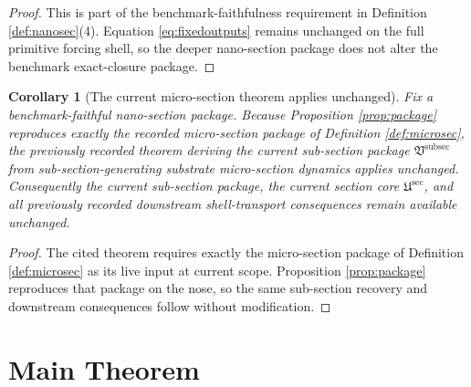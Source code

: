 \documentclass[11pt]{article}
\newcommand{\SubPreSectionCore}{\mathfrak U^{\mathrm{sec}}}
\newcommand{\SubSectionPackage}{\mathfrak V^{\mathrm{subsec}}}
\newtheorem{corollary}{Corollary}
\begin{document}
\begin{proof}
This is part of the benchmark-faithfulness requirement in Definition \ref{def:nanosec}(4). Equation \eqref{eq:fixedoutputs} remains unchanged on the full primitive forcing shell, so the deeper nano-section package does not alter the benchmark exact-closure package.
\end{proof}

\begin{corollary}[The current micro-section theorem applies unchanged]
\label{cor:micro}
Fix a benchmark-faithful nano-section package. Because Proposition \ref{prop:package} reproduces exactly the recorded micro-section package of Definition \ref{def:microsec}, the previously recorded theorem deriving the current sub-section package \(\SubSectionPackage\) from sub-section-generating substrate micro-section dynamics applies unchanged. Consequently the current sub-section package, the current section core \(\SubPreSectionCore\), and all previously recorded downstream shell-transport consequences remain available unchanged.
\end{corollary}

\begin{proof}
The cited theorem requires exactly the micro-section package of Definition \ref{def:microsec} as its live input at current scope. Proposition \ref{prop:package} reproduces that package on the nose, so the same sub-section recovery and downstream consequences follow without modification.
\end{proof}

\section{Main Theorem}
\end{document}
